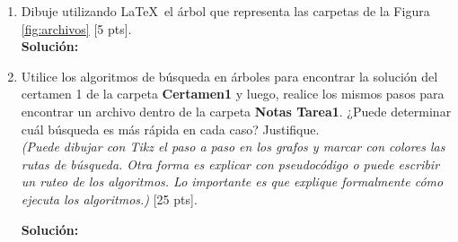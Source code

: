 \documentclass[letterpaper,10pt]{article}
\begin{document}
\begin{enumerate}
\begin{enumerate}
    \item Dibuje utilizando \LaTeX \  el árbol que representa las carpetas de la Figura \ref{fig:archivos} [5 pts].\\
    \textbf{Solución:}

    \item Utilice los algoritmos de búsqueda en árboles para encontrar la solución del certamen 1 de la carpeta \textbf{Certamen1} y luego, realice los mismos pasos para encontrar un archivo dentro de la carpeta \textbf{Notas Tarea1}. ¿Puede determinar cuál búsqueda es más rápida en cada caso? Justifique.\\
    \textit{(Puede dibujar con Tikz el paso a paso en los grafos y marcar con colores las rutas de búsqueda. Otra forma es explicar con pseudocódigo o puede escribir un ruteo de los algoritmos. Lo importante es que explique formalmente cómo ejecuta los algoritmos.)} [25 pts].
    
    \textbf{Solución:}
\end{enumerate}


\end{enumerate}
\end{document}
